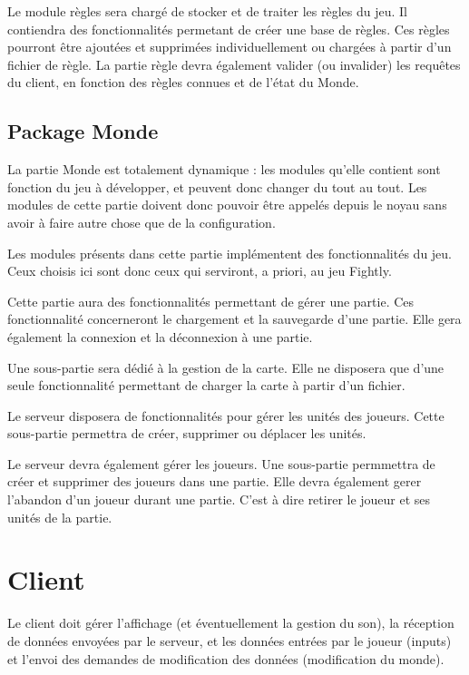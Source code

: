\documentclass[a4paper,10pt]{report}
\begin{document}
        Le module règles sera chargé de stocker et de traiter les règles du jeu. Il contiendra des fonctionnalités permetant de créer une base de règles. Ces règles pourront être ajoutées et supprimées individuellement ou chargées à partir d'un fichier de règle. La partie règle devra également valider (ou invalider) les requêtes du client, en fonction des règles connues et de l'état du Monde.

      \subsection{Package Monde}

        La partie Monde est totalement dynamique : les modules qu'elle contient sont fonction du jeu à développer, et peuvent donc changer du tout au tout. Les modules de cette partie doivent donc pouvoir être appelés depuis le noyau sans avoir à faire autre chose que de la configuration. 

        Les modules présents dans cette partie implémentent des fonctionnalités du jeu. Ceux choisis ici sont donc ceux qui serviront, a priori, au jeu Fightly.

        Cette partie aura des fonctionnalités permettant de gérer une partie. Ces fonctionnalité concerneront le chargement et la sauvegarde d'une partie. Elle gera également la connexion et la déconnexion à une partie.

        Une sous-partie sera dédié à la gestion de la carte. Elle ne disposera que d'une seule fonctionnalité permettant de charger la carte à partir d'un fichier.

        Le serveur disposera de fonctionnalités pour gérer les unités des joueurs. Cette sous-partie permettra de créer, supprimer ou déplacer les unités.

        Le serveur devra également gérer les joueurs. Une sous-partie permmettra de créer et supprimer des joueurs dans une partie. Elle devra également gerer l'abandon d'un joueur durant une partie. C'est à dire retirer le joueur et ses unités de la partie.

    \section{Client}

      Le client doit gérer l'affichage (et éventuellement la gestion du son), la réception de données envoyées par le serveur, et les données entrées par le joueur (inputs) et l'envoi des demandes de modification des données (modification du monde).
\end{document}
